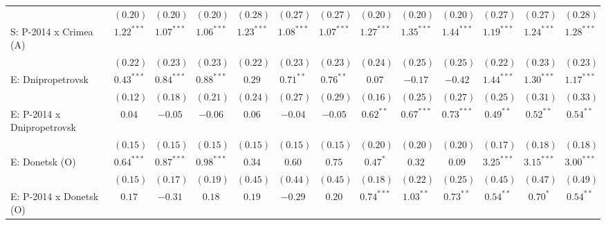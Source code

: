 \begin{table}
\begin{center}
\begin{tiny}
\begin{tabular}{l c c c c c c c c c c c c}
                            & $(0.20)$      & $(0.20)$      & $(0.20)$      & $(0.28)$     & $(0.27)$     & $(0.27)$     & $(0.20)$      & $(0.20)$      & $(0.20)$       & $(0.27)$      & $(0.27)$      & $(0.28)$      \\
S: P-2014 x Crimea (A)      & $1.22^{***}$  & $1.07^{***}$  & $1.06^{***}$  & $1.23^{***}$ & $1.08^{***}$ & $1.07^{***}$ & $1.27^{***}$  & $1.35^{***}$  & $1.44^{***}$   & $1.19^{***}$  & $1.24^{***}$  & $1.28^{***}$  \\
                            & $(0.22)$      & $(0.23)$      & $(0.23)$      & $(0.22)$     & $(0.23)$     & $(0.23)$     & $(0.24)$      & $(0.25)$      & $(0.25)$       & $(0.22)$      & $(0.23)$      & $(0.23)$      \\
E: Dnipropetrovsk           & $0.43^{***}$  & $0.84^{***}$  & $0.88^{***}$  & $0.29$       & $0.71^{**}$  & $0.76^{**}$  & $0.07$        & $-0.17$       & $-0.42$        & $1.44^{***}$  & $1.30^{***}$  & $1.17^{***}$  \\
                            & $(0.12)$      & $(0.18)$      & $(0.21)$      & $(0.24)$     & $(0.27)$     & $(0.29)$     & $(0.16)$      & $(0.25)$      & $(0.27)$       & $(0.25)$      & $(0.31)$      & $(0.33)$      \\
E: P-2014 x Dnipropetrovsk  & $0.04$        & $-0.05$       & $-0.06$       & $0.06$       & $-0.04$      & $-0.05$      & $0.62^{**}$   & $0.67^{***}$  & $0.73^{***}$   & $0.49^{**}$   & $0.52^{**}$   & $0.54^{**}$   \\
                            & $(0.15)$      & $(0.15)$      & $(0.15)$      & $(0.15)$     & $(0.15)$     & $(0.15)$     & $(0.20)$      & $(0.20)$      & $(0.20)$       & $(0.17)$      & $(0.18)$      & $(0.18)$      \\
E: Donetsk (O)              & $0.64^{***}$  & $0.87^{***}$  & $0.98^{***}$  & $0.34$       & $0.60$       & $0.75$       & $0.47^{*}$    & $0.32$        & $0.09$         & $3.25^{***}$  & $3.15^{***}$  & $3.00^{***}$  \\
                            & $(0.15)$      & $(0.17)$      & $(0.19)$      & $(0.45)$     & $(0.44)$     & $(0.45)$     & $(0.18)$      & $(0.22)$      & $(0.25)$       & $(0.45)$      & $(0.47)$      & $(0.49)$      \\
E: P-2014 x Donetsk (O)     & $0.17$        & $-0.31$       & $0.18$        & $0.19$       & $-0.29$      & $0.20$       & $0.74^{***}$  & $1.03^{**}$   & $0.73^{**}$    & $0.54^{**}$   & $0.70^{*}$    & $0.54^{**}$   \\

\end{tabular}
\end{tiny}
\end{center}
\end{table}
